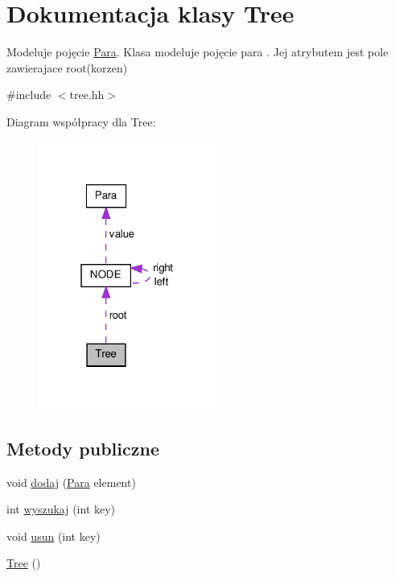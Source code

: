 \hypertarget{class_tree}{\section{Dokumentacja klasy Tree}
\label{class_tree}
}


Modeluje pojęcie \hyperlink{class_para}{Para}. Klasa modeluje pojęcie para . Jej atrybutem jest pole zawierajace root(korzen)  




{\ttfamily \#include $<$tree.\-hh$>$}



Diagram współpracy dla Tree\-:\nopagebreak
\begin{figure}[H]
\begin{center}
\leavevmode
\includegraphics[width=166pt]{class_tree__coll__graph}
\end{center}
\end{figure}
\subsection*{Metody publiczne}
\begin{DoxyCompactItemize}
\item 
void \hyperlink{class_tree_ab7fedd8767bedee15602ac3611a85d8a}{dodaj} (\hyperlink{class_para}{Para} element)
\item 
int \hyperlink{class_tree_a1289bf12ad417b94c64b37c340ee4d1e}{wyszukaj} (int key)
\item 
void \hyperlink{class_tree_af8902c205c23f79e8ad7befec9f4cd3c}{usun} (int key)
\item 
\hyperlink{class_tree_ad376a7c639d857312f5de2ef47482f68}{Tree} ()
\end{DoxyCompactItemize}
